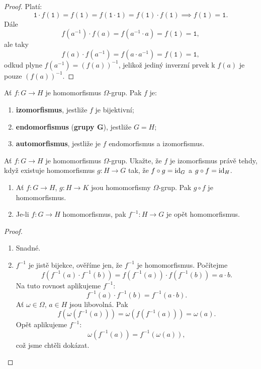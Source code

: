 \begin{proof}
	Platí:
	$$
	    \mathtt 1 \cdot f(\mathtt 1)=f(\mathtt 1)=f(\mathtt 1\cdot \mathtt 1)=f(\mathtt 1)\cdot f(\mathtt 1)\implies f(\mathtt 1)=\mathtt 1.
	$$
	Dále
	$$
	    f(a^{-1})\cdot f(a)=f(a^{-1}\cdot a)=f(\mathtt 1)=\mathtt 1,
	$$
	ale taky
	$$
	    f(a)\cdot f(a^{-1})=f(a\cdot a^{-1})=f(\mathtt 1)=\mathtt 1,
	$$
	odkud plyne $f(a^{-1})=\left( f(a) \right )^{-1} $, jelikož jediný inverzní prvek k $f(a)$ je pouze
	$\left( f(a) \right )^{-1} $.
\end{proof}

\begin{definice}
	Ať $f: G\to H$ je homomorfismus $\Omega$-grup. Pak $f$ je:
	\begin{enumerate}[($i$)]
		\item \textbf{izomorfismus}, jestliže $f$ je bijektivní;
		\item \textbf{endomorfismus} (\textbf{grupy G}), jestliže $G=H$;
		\item \textbf{automorfismus}, jestliže je $f$ endomorfismus a izomorfismus.
	\end{enumerate}
\end{definice}

\begin{cviceni}
	Ať $f:G\to H$ je homomorfismus $\Omega$-grup. Ukažte, že $f$ je izomorfismus právě
	tehdy, když existuje homomorfismus $g:H\to G$ tak, že $f\circ g=\mathrm{id}_G$ a $g\circ f=\mathrm{id}_H$.
\end{cviceni}

\begin{lemma}
    \begin{enumerate}[($i$)]
    	\item Ať $f:G\to H$, $g:H\to K$ jsou homomorfismy $\Omega$-grup. Pak $g\circ f$ je
        homomorfismus.
        \item Je-li $f:G\to H$ homomorfismus, pak $f^{-1}:H\to G$ je opět homomorfismus.
    \end{enumerate}
\end{lemma}

\begin{proof}
    \begin{enumerate}[($i$)]
    	\item Snadné.
        \item $f^{-1}$ je jistě bijekce, ověříme jen, že $f^{-1}$ je homomorfismus. Počítejme
        $$
            f \left( f^{-1}(a)\cdot f^{-1}(b) \right )=f \left( f^{-1}(a) \right )\cdot f \left( f^{-1}(b) \right )=a\cdot b.
        $$
        Na tuto rovnost aplikujeme $f^{-1}$:
        $$
            f^{-1}(a)\cdot f^{-1}(b)=f^{-1}(a\cdot b).
        $$
        Ať $\omega \in \Omega$, $a \in H$ jsou libovolná. Pak
        $$
            f \left( \omega \left( f^{-1}(a) \right )  \right )=\omega \left( f \left( f^{-1}(a) \right )  \right )=\omega(a).
        $$
        Opět aplikujeme $f^{-1}$:
        $$
            \omega \left( f^{-1}(a) \right )=f^{-1}\left( \omega (a) \right ),
        $$
        což jsme chtěli dokázat.
        \qedhere
    \end{enumerate}
\end{proof}

